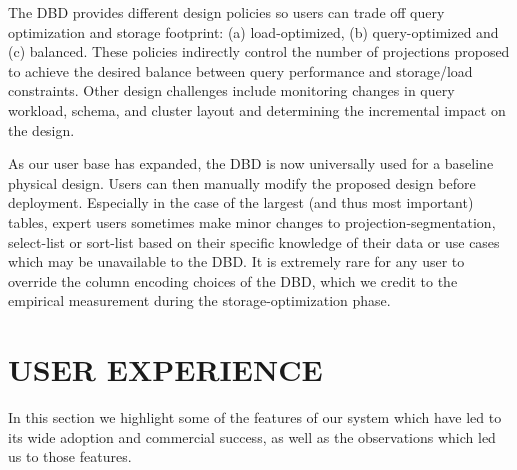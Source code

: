 \documentclass[a4paper,12pt,notitlepage,twoside,openright]{article}
\begin{document}
The DBD provides different design policies so users can trade off query
optimization and storage footprint: (a) load-optimized, (b)
query-optimized and (c) balanced. These policies indirectly control the
number of projections proposed to achieve the desired balance between
query performance and storage/load constraints. Other design challenges
include monitoring changes in query workload, schema, and cluster layout
and determining the incremental impact on the design.

As our user base has expanded, the DBD is now universally used for a
baseline physical design. Users can then manually modify the proposed
design before deployment. Especially in the case of the largest (and
thus most important) tables, expert users sometimes make minor changes
to projection-segmentation, select-list or sort-list based on their
specific knowledge of their data or use cases which may be unavailable
to the DBD. It is extremely rare for any user to override the column
encoding choices of the DBD, which we credit to the empirical
measurement during the storage-optimization phase.

\hypertarget{user-experience}{%
\section{USER EXPERIENCE}\label{user-experience}}

In this section we highlight some of the features of our system which
have led to its wide adoption and commercial success, as well as the
observations which led us to those features.
\end{document}
